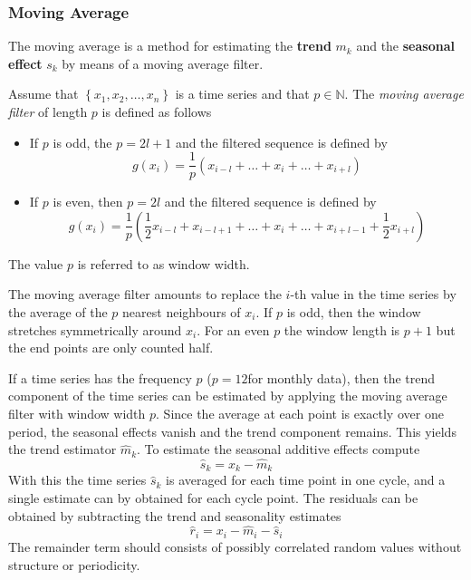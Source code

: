 \documentclass[11pt]{article}
\theoremstyle{definition}
\begin{document}
\subsubsection{Moving Average}
The moving average is a method for estimating the \textbf{trend} $m_k$ and the \textbf{seasonal effect} $s_k$ by means of a moving average filter.
\begin{definition}
	Assume that $\left\{x_1,x_2,\dots, x_n\right\}$ is a time series and that $p\in\mathbb{N}$. The \emph{moving average filter} of length $p$ is defined as follows
	\begin{itemize}
		\item If $p$ is odd, the $p = 2l + 1$ and the filtered sequence is defined by
		\begin{equation*}
			g(x_i) = \frac{1}{p} (x_{i-l} + \dots + x_i + \dots + x_{i+l})
		\end{equation*}
		\item If $p$ is even, then $p = 2l$ and the filtered sequence is defined by
		\begin{equation*}
			g(x_i) = \frac{1}{p} (\frac{1}{2}x_{i-l} + x_{i-l+1} + \dots + x_i + \dots + x_{i+l-1} + \frac{1}{2} x_{i+l})
		\end{equation*}
	\end{itemize}
	The value $p$ is referred to as window width.
\end{definition}
The moving average filter amounts to replace the $i$-th value in the time series by the average of the $p$ nearest neighbours of $x_i$. If $p$ is odd, then the window stretches symmetrically around $x_i$. For an even $p$ the window length is $p+1$ but the end points are only counted half.

If a time series has the frequency $p$ ($p = 12 $for monthly data), then the trend component of the time series can be estimated by applying the moving average filter with window width $p$. Since the average at each point is exactly over one period, the seasonal effects vanish and the trend component remains. This yields the trend estimator $\hat{m}_k$. To estimate the seasonal additive effects compute
\begin{equation*}
	\hat{s}_k = x_k - \hat{m}_k
\end{equation*}
With this the time series $\hat{s}_k$ is averaged for each time point in one cycle, and a single estimate can by obtained for each cycle point. The residuals can be obtained by subtracting the trend and seasonality estimates
\begin{equation*}
	\hat{r}_i = x_i - \hat{m}_i - \hat{s}_i
\end{equation*}
The remainder term should consists of possibly correlated random values without structure or periodicity.
\end{document}
